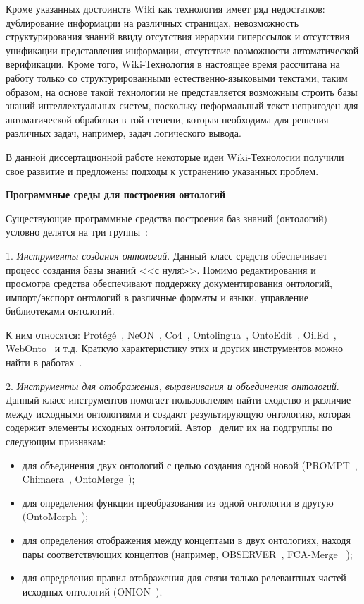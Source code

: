 Кроме указанных достоинств Wiki как технология имеет ряд недостатков:  дублирование информации на различных страницах, невозможность структурирования знаний ввиду отсутствия иерархии гиперссылок и отсутствия унификации представления информации, отсутствие возможности автоматической верификации. Кроме того, Wiki-Технология в настоящее время рассчитана на работу только со структурированными естественно-языковыми текстами, таким образом, на основе такой технологии не представляется возможным строить базы знаний интеллектуальных систем, поскольку неформальный текст непригоден для автоматической обработки в той степени, которая необходима для решения различных задач, например, задач логического вывода.

В данной диссертационной работе некоторые идеи Wiki-Технологии получили свое развитие и предложены подходы к устранению указанных проблем.

\textbf{Программные среды для построения онтологий}

Существующие программные средства построения баз знаний (онтологий) условно делятся на три группы~\cite{Chistiakova2014}:

1. \textit{Инструменты создания онтологий}. Данный класс средств обеспечивает процесс создания базы знаний <<с нуля>>. Помимо редактирования и просмотра средства обеспечивают поддержку документирования онтологий, импорт/экспорт онтологий в различные форматы и языки, управление библиотеками онтологий.

К ним относятся: Protégé~\cite{Protege2016}, NeON~\cite{Gomez2009}, Co4~\cite{Euzenat1996}, Ontolingua~\cite{Ontolingua2005}, OntoEdit~\cite{OntoEdit2002}, OilEd~\cite{OilEd2013}, WebOnto~\cite{Domigue2016} и т.д. Краткую характеристику этих и других инструментов можно найти в работах~\cite{BorgestRole2014, Ovdei2016, Alatrish2013}.

2. \textit{Инструменты для отображения, выравнивания и объединения онтологий}. Данный класс инструментов помогает пользователям найти сходство и различие между исходными онтологиями и создают результирующую онтологию, которая содержит элементы исходных онтологий. Автор~\cite{Ovdei2016} делит их на подгруппы по следующим признакам: 
\begin{itemize}
    \item для объединения двух онтологий с целью создания одной новой (PROMPT~\cite{PROMPT2016}, Chimaera~\cite{Chimaera2003}, OntoMerge~\cite{OntoMerge78});
    \item для определения функции преобразования из одной онтологии в другую (OntoMorph~\cite{Chalupsky2000}); 
    \item для определения отображения между концептами в двух онтологиях, находя пары соответствующих концептов (например, OBSERVER~\cite{OntologySystemEnhanced2003}, FCA-Merge ~\cite{FCA-Merge});
    \item для определения правил отображения для связи только релевантных частей исходных онтологий (ONION~\cite{ONION2006}).
\end{itemize}


